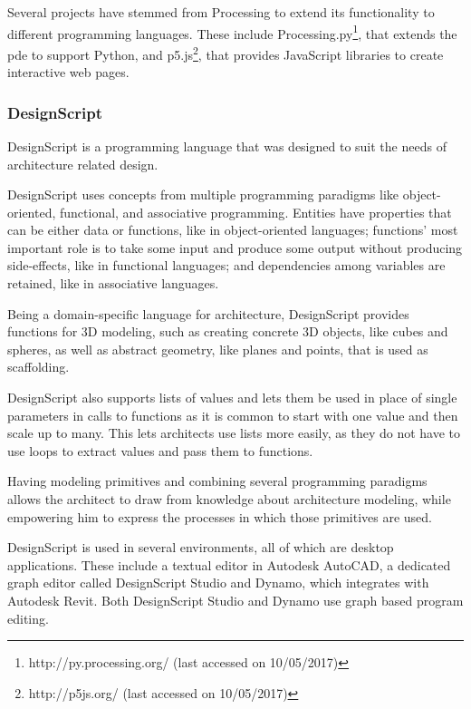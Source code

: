 Several projects have stemmed from Processing to extend its functionality to different programming languages.
These include Processing.py\footnote{http://py.processing.org/ (last accessed on 10/05/2017)}, that extends the \gls{pde} to support Python, and p5.js\footnote{http://p5js.org/ (last accessed on 10/05/2017)}, that provides JavaScript libraries to create interactive web pages.


\subsubsection{DesignScript}
\label{section:designscript:related}
DesignScript\cite{aish2012designscript} is a programming language that was designed to suit the needs of architecture related design.

DesignScript uses concepts from multiple programming paradigms like object-oriented, functional, and associative programming\cite{aish2012designscript}.
Entities have properties that can be either data or functions, like in object-oriented languages; functions' most important role is to take some input and produce some output without producing side-effects, like in functional languages; and dependencies among variables are retained, like in associative languages.

Being a domain-specific language for architecture, DesignScript provides functions for 3D modeling, such as creating concrete 3D objects, like cubes and spheres, as well as abstract geometry, like planes and points, that is used as scaffolding.

DesignScript also supports lists of values and lets them be used in place of single parameters in calls to functions as it is common to start with one value and then scale up to many.
This lets architects use lists more easily, as they do not have to use loops to extract values and pass them to functions.

Having modeling primitives and combining several programming paradigms allows the architect to draw from knowledge about architecture modeling, while empowering him to express the processes in which those primitives are used.

DesignScript is used in several environments, all of which are desktop applications.
These include a textual editor in Autodesk AutoCAD, a dedicated graph editor called DesignScript Studio and Dynamo, which integrates with Autodesk Revit.
Both DesignScript Studio and Dynamo use graph based program editing.


